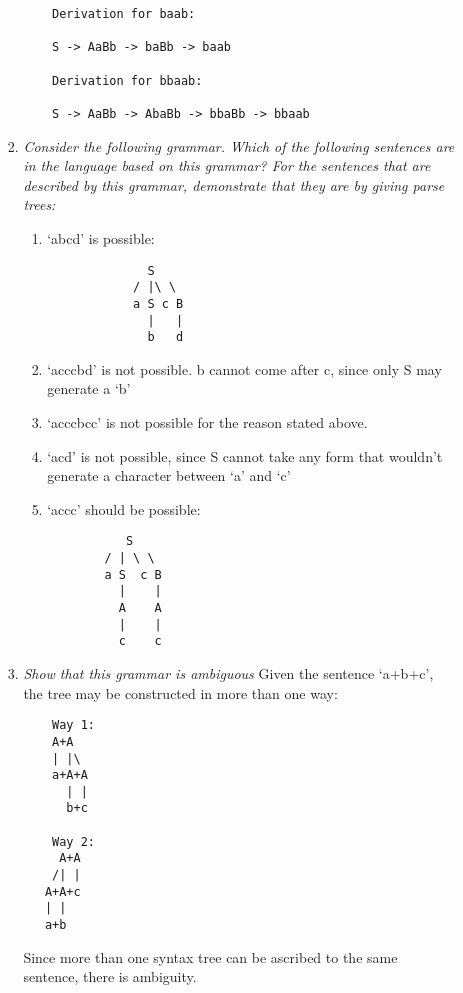 \documentclass[12pt,letterpaper]{article}
\begin{document}
\begin{enumerate}
\begin{enumerate}
\begin{enumerate}
    \begin{verbatim}
    Derivation for baab:
    
    S -> AaBb -> baBb -> baab
    
    Derivation for bbaab:
    
    S -> AaBb -> AbaBb -> bbaBb -> bbaab
    \end{verbatim}
    
    \item \textit{Consider the following grammar. Which of the following sentences are in the language based on this grammar? For the sentences that are described by this grammar, demonstrate that they are by giving parse trees:}
    
    \begin{enumerate}
        \item `abcd' is possible:
        \begin{verbatim}
              S
            / |\ \
            a S c B
              |   |
              b   d
        \end{verbatim}
        
        \item `acccbd' is not possible. b cannot come after c, since only S may generate a `b'
        \item `acccbcc' is not possible for the reason stated above.
        \item `acd' is not possible, since S cannot take any form that wouldn't generate a character between `a' and `c'
        \item `accc' should be possible:
        \begin{verbatim}
           S
        / | \ \
        a S  c B
          |    |
          A    A
          |    |
          c    c
        \end{verbatim}
    \end{enumerate}
    
    \item \textit{Show that this grammar is ambiguous}
    Given the sentence `a+b+c', the tree may be constructed in more than one way:
    \begin{verbatim}
    Way 1:
    A+A
    | |\
    a+A+A
      | |
      b+c
    
    Way 2:
     A+A
    /| |
   A+A+c
   | |
   a+b
   \end{verbatim}
   
   Since more than one syntax tree can be ascribed to the same sentence, there is ambiguity.
   

\end{enumerate}
\end{enumerate}
\end{enumerate}
\end{document}
